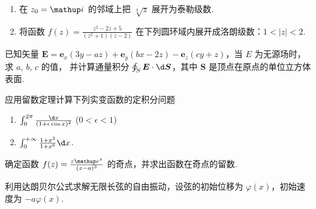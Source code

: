 \documentclass[quiet]{ctexart}
\begin{document}
\begin{problem}[本题 11 分]\leavevmode
  \begin{enumerate}
    \item 在 $z_0 = \iu$ 的邻域上把 $\sqrt[3]z$ 展开为泰勒级数.
    \item 将函数 $f(z) = \frac{z^2 - 2z + 5}{(z^2 + 1)(z - 2)}$ 在下列圆环域内展开成洛朗级数：$1 < |z| < 2$.
  \end{enumerate}
\end{problem}
\begin{solution}
  
\end{solution}

\begin{problem}[本题 6 分]
  已知矢量 $\bm E = \bm e_x(3y - az) + \bm e_y(bx - 2z) - \bm e_z(cy + z)$，当 $E$ 为无源场时，求 $a$, $b$, $c$ 的值，
  并计算通量积分 $\oint_S\bm E \cdot \d\bm S$，其中 $\bm S$ 是顶点在原点的单位立方体表面.
\end{problem}
\begin{solution}
  
\end{solution}

\begin{problem}[本题 10 分]
  应用留数定理计算下列实变函数的定积分问题
  \begin{enumerate}
    \item $\int_0^{2\pi} \frac{\d x}{(1 + \epsilon \cos x)^2}$ ($0 < \epsilon < 1$)
    \item $\int_0^{+\infty} \frac{1 + x^2}{1 + x^6} \d x$.
  \end{enumerate}
\end{problem}
\begin{solution}
  
\end{solution}

\begin{problem}[本题 5 分]
  确定函数 $f(z) = \frac{z\eu^z}{(z - a)^3}$ 的奇点，并求出函数在奇点的留数.
\end{problem}
\begin{solution}
  
\end{solution}

\begin{problem}[本题 8 分]
  利用达朗贝尔公式求解无限长弦的自由振动，设弦的初始位移为 $\varphi(x)$，初始速度为 $-a\varphi(x)$.
\end{problem}
\begin{solution}
  
\end{solution}
\end{document}
